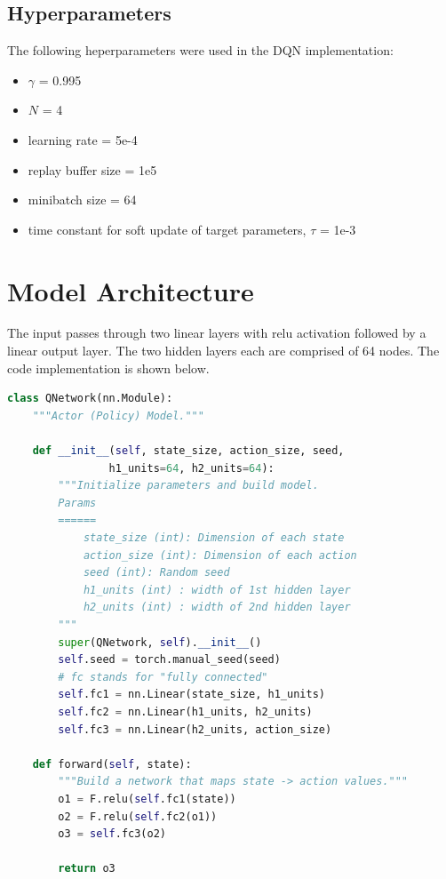 \documentclass{article}
\begin{document}
\subsection{Hyperparameters}
The following heperparameters were used in the DQN implementation:

\begin{itemize}
\item  $\gamma$ = 0.995
\item $N$ = 4
\item learning rate = 5e-4
\item replay buffer size  = 1e5
\item minibatch size = 64
\item time constant for soft update of target parameters, $\tau$ = 1e-3
\end{itemize}


\section{Model Architecture}
The input passes through two linear layers with relu activation followed by a linear output layer. The two hidden layers each are comprised of 64 nodes. The code implementation is shown below. 

\begin{lstlisting}[language=Python]
class QNetwork(nn.Module):
    """Actor (Policy) Model."""

    def __init__(self, state_size, action_size, seed,
                h1_units=64, h2_units=64):
        """Initialize parameters and build model.
        Params
        ======
            state_size (int): Dimension of each state
            action_size (int): Dimension of each action
            seed (int): Random seed
            h1_units (int) : width of 1st hidden layer
            h2_units (int) : width of 2nd hidden layer
        """
        super(QNetwork, self).__init__()
        self.seed = torch.manual_seed(seed)
        # fc stands for "fully connected"
        self.fc1 = nn.Linear(state_size, h1_units)
        self.fc2 = nn.Linear(h1_units, h2_units)
        self.fc3 = nn.Linear(h2_units, action_size)

    def forward(self, state):
        """Build a network that maps state -> action values."""
        o1 = F.relu(self.fc1(state))
        o2 = F.relu(self.fc2(o1))
        o3 = self.fc3(o2)
        
        return o3
\end{lstlisting}
\end{document}
